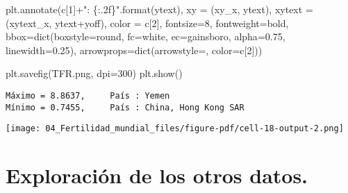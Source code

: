 \documentclass[
  letterpaper,
  DIV=11,
  numbers=noendperiod]{scrreprt}
\newenvironment{Shaded}{\begin{snugshade}}{\end{snugshade}}
\newcommand{\BuiltInTok}[1]{\textcolor[rgb]{0.00,0.23,0.31}{#1}}
\newcommand{\DecValTok}[1]{\textcolor[rgb]{0.68,0.00,0.00}{#1}}
\newcommand{\FloatTok}[1]{\textcolor[rgb]{0.68,0.00,0.00}{#1}}
\newcommand{\NormalTok}[1]{\textcolor[rgb]{0.00,0.23,0.31}{#1}}
\newcommand{\OperatorTok}[1]{\textcolor[rgb]{0.37,0.37,0.37}{#1}}
\newcommand{\SpecialCharTok}[1]{\textcolor[rgb]{0.37,0.37,0.37}{#1}}
\newcommand{\StringTok}[1]{\textcolor[rgb]{0.13,0.47,0.30}{#1}}
\begin{document}
\begin{Shaded}
\begin{Highlighting}[]
\NormalTok{    plt.annotate(c[}\DecValTok{1}\NormalTok{]}\OperatorTok{+}\StringTok{": }\SpecialCharTok{\{:.2f\}}\StringTok{"}\NormalTok{.}\BuiltInTok{format}\NormalTok{(ytext), xy }\OperatorTok{=}\NormalTok{ (xy\_x, ytext), xytext }\OperatorTok{=}\NormalTok{ (xytext\_x, ytext}\OperatorTok{+}\NormalTok{yoff), }
\NormalTok{                     color }\OperatorTok{=}\NormalTok{ c[}\DecValTok{2}\NormalTok{], fontsize}\OperatorTok{=}\DecValTok{8}\NormalTok{, fontweight}\OperatorTok{=}\StringTok{\textquotesingle{}bold\textquotesingle{}}\NormalTok{,}
\NormalTok{                     bbox}\OperatorTok{=}\BuiltInTok{dict}\NormalTok{(boxstyle}\OperatorTok{=}\StringTok{\textquotesingle{}round\textquotesingle{}}\NormalTok{, fc}\OperatorTok{=}\StringTok{\textquotesingle{}white\textquotesingle{}}\NormalTok{, ec}\OperatorTok{=}\StringTok{\textquotesingle{}gainsboro\textquotesingle{}}\NormalTok{, alpha}\OperatorTok{=}\FloatTok{0.75}\NormalTok{, linewidth}\OperatorTok{=}\FloatTok{0.25}\NormalTok{),}
\NormalTok{                     arrowprops}\OperatorTok{=}\BuiltInTok{dict}\NormalTok{(arrowstyle}\OperatorTok{=}\StringTok{\textquotesingle{}{-}\textquotesingle{}}\NormalTok{, color}\OperatorTok{=}\NormalTok{c[}\DecValTok{2}\NormalTok{]))}

\NormalTok{plt.savefig(}\StringTok{\textquotesingle{}TFR.png\textquotesingle{}}\NormalTok{, dpi}\OperatorTok{=}\DecValTok{300}\NormalTok{)}
\NormalTok{plt.show()}
\end{Highlighting}
\end{Shaded}

\begin{verbatim}
Máximo = 8.8637,     País : Yemen
Mínimo = 0.7455,     País : China, Hong Kong SAR
\end{verbatim}

\texttt{[image: 04\_Fertilidad\_mundial\_files/figure-pdf/cell-18-output-2.png]}

\section{Exploración de los otros
datos.}\label{exploraciuxf3n-de-los-otros-datos.}
\end{document}

